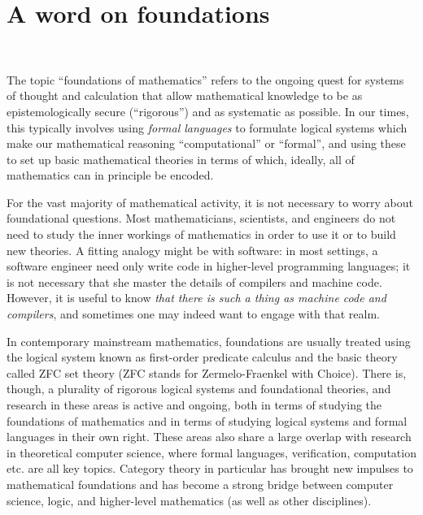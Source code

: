 
\section{A word on foundations}\label{sec:foundations}


\

The topic ``foundations of mathematics'' refers to the ongoing quest for systems of thought and calculation that allow mathematical knowledge to be as epistemologically secure (``rigorous'') and as systematic as possible.
In our times, this typically involves using \emph{formal languages} to formulate logical systems which make our mathematical reasoning ``computational'' or ``formal'', and using these to set up basic mathematical theories in terms of which, ideally, all of mathematics can in principle be encoded.

For the vast majority of mathematical activity, it is not necessary to worry about foundational questions.
Most mathematicians, scientists, and engineers do not need to study the inner workings of mathematics in order to use it or to build new theories.
A fitting analogy might be with software: in most settings, a software engineer need only write code in higher-level programming languages; it is not necessary that she master the details of compilers and machine code.
However, it is useful to know \emph{that there is such a thing as machine code and compilers}, and sometimes one may indeed want to engage with that realm.

In contemporary mainstream mathematics, foundations are usually treated using the logical system known as first-order predicate calculus and the basic theory called ZFC set theory (ZFC stands for Zermelo-Fraenkel with Choice).
There is, though, a plurality of rigorous logical systems and foundational theories, and research in these areas is active and ongoing, both in terms of studying the foundations of mathematics and in terms of studying logical systems and formal languages in their own right.
These areas also share a large overlap with research in theoretical computer science, where formal languages, verification, computation etc. are all key topics.
Category theory in particular has brought new impulses to mathematical foundations and has become a strong bridge between computer science, logic, and higher-level mathematics (as well as other disciplines).

